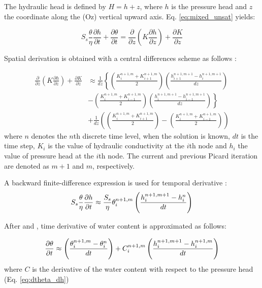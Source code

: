 \documentclass[a4paper,12pt]{article}
\begin{document}
The hydraulic head is defined by $H = h + z$, where $h$ is the pressure head and $z$ the coordinate along the (Oz) vertical upward axis. Eq. \ref{eq:mixed_unsat} yields: 

\begin{equation} \label{eq:mixed_unsat2}
    S_s \frac{\theta}{\eta} \frac{\partial h}{\partial t} + \frac{\partial \theta}{\partial t} =
	 \frac{\partial}{\partial z} \left( K \frac{\partial h}{\partial z} \right) + \frac{\partial K}{\partial z}
\end{equation}

Spatial derivation is obtained with a central differences scheme as follows : 

\begin{align} \label{eq:space_discret}
      \frac{\partial}{\partial z} \left( K \frac{\partial h}{\partial z} \right) + \frac{\partial K}{\partial z} & \approx  \frac{1}{dz} \left\{ \left(\frac{K_i^{n+1,m}+K_{i+1}^{n+1,m}}{2}\right) \left(\frac{h_{i+1}^{n+1,m+1} - h_i^{n+1,m+1}}{dz} \right) \right. \nonumber \\
      &  - \left. \left(\frac{K_i^{n+1,m}+K_{i-1}^{n+1,m}}{2}\right) \left(\frac{h_{i}^{n+1,m+1} - h_{i-1}^{n+1,m+1}}{dz} \right)  \right\} \nonumber  \\
      & + \frac{1}{dz} \left( \left(\frac{K_i^{n+1,m}+K_{i+1}^{n+1,m}}{2}\right) - \left(\frac{K_i^{n+1,m}+K_{i-1}^{n+1,m}}{2}  \right) \right)  
\end{align}
where $n$ denotes the $n$th discrete time level, when the solution is known, $dt$ is the time step, $K_i$ is the value of hydraulic conductivity at the $i$th node and $h_i$ the value of pressure head at the $i$th node. The current and previous Picard iteration are denoted as $m+1$ and $m$, respectively.

A backward finite-difference expression is used for temporal derivative : 
\begin{equation}  \label{eq:dh_temp_deriv}
    S_s \frac{\theta}{\eta} \frac{\partial h}{\partial t} \approx \frac{S_s}{\eta}\theta_i^{n+1,m} \left( { h_i^{n+1,m+1} - h_i^n \over dt} \right)
\end{equation}

After \cite{Celiaetal1990} and \cite{Clementetal1994}, time derivative of water content is approximated as follows:

\begin{equation} \label{eq:theta_temp_deriv}
    \frac{\partial \theta}{\partial t} \approx \left( {\theta_i^{n+1,m} - \theta_i^n \over dt} \right) + C_i^{n+1,m} \left( {h_i^{n+1,m+1}-h_i^{n+1,m} \over dt} \right)
\end{equation}
where $C$ is the derivative of the water content with respect to the pressure head (Eq. \ref{eq:dtheta_dh})
\end{document}
